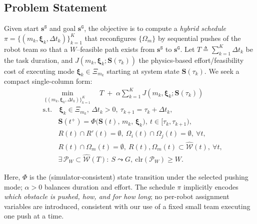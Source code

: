 \subsection{Problem Statement}\label{subsec:objective}
Given start $\mathbf{s}^{\texttt{S}}$ and goal $\mathbf{s}^{\texttt{G}}$,
the objective is to compute a \emph{hybrid schedule}
$\pi=\{(m_k,\boldsymbol{\xi}_k,\Delta t_k)\}_{k=1}^{K}$ that reconfigures
$\{\Omega_m\}$ by sequential pushes of the robot team so that a $W$–feasible
path exists from $\mathbf{s}^{\texttt{S}}$ to $\mathbf{s}^{\texttt{G}}$.
Let $T\triangleq\sum_{k=1}^{K}\Delta t_k$ be the task duration, and
$J(m_k,\boldsymbol{\xi}_k;\mathbf{S}(\tau_k))$ the physics-based effort/feasibility
cost of executing mode $\boldsymbol{\xi}_k\in\Xi_{m_k}$ starting at system state
$\mathbf{S}(\tau_k)$.
We seek a compact single-column form:
\vspace{-2pt}
\begin{equation}\label{eq:problem}
\begin{aligned}
&\min_{\{(m_k,\boldsymbol{\xi}_k,\Delta t_k)\}_{k=1}^{K}}
\quad  T\;+\;\alpha\sum_{k=1}^{K} J\!\left(m_k,\boldsymbol{\xi}_k;\mathbf{S}(\tau_k)\right) \\
& \text{s.t.}\quad
\boldsymbol{\xi}_k\in\Xi_{m_k},\ \Delta t_k>0,\ \tau_{k+1}=\tau_k+\Delta t_k, \\
& \ \quad\quad \mathbf{S}(t^+)=\Phi\big(\mathbf{S}(t),\,m_k,\,\boldsymbol{\xi}_k\big),\ t\in[\tau_k,\tau_{k+1}), \\
& \ \quad\quad R(t)\cap R'(t)=\emptyset,\ \Omega_i(t)\cap\Omega_j(t)=\emptyset,\ \forall t, \\
& \ \quad\quad R(t)\cap\Omega_m(t)=\emptyset,\ R(t),\Omega_m(t)\subset\widehat{\mathcal{W}}(t),\ \forall t, \\
& \ \quad\quad \exists\,\mathcal{P}_W\subset\widehat{\mathcal{W}}(T):\ S\leadsto G,\ \text{clr}(\mathcal{P}_W)\ge W.
\end{aligned}
\end{equation}
\vspace{-4pt}

Here, $\Phi$ is the (simulator-consistent) state transition under the selected
pushing mode; $\alpha>0$ balances duration and effort. The schedule $\pi$
implicitly encodes \emph{which obstacle is pushed, how, and for how long};
no per-robot assignment variables are introduced, consistent with our use of a
fixed small team executing one push at a time.
